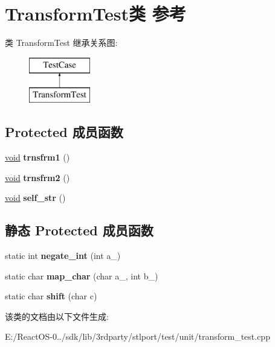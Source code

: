 \hypertarget{class_transform_test}{}\section{Transform\+Test类 参考}
\label{class_transform_test}
类 Transform\+Test 继承关系图\+:\begin{figure}[H]
\begin{center}
\leavevmode
\includegraphics[height=2.000000cm]{class_transform_test}
\end{center}
\end{figure}
\subsection*{Protected 成员函数}
\begin{DoxyCompactItemize}
\item 
\mbox{\label{class_transform_test_adeccd6cd54c7ce060ed81268fd830911}} 
\hyperlink{interfacevoid}{void} {\bfseries trnsfrm1} ()
\item 
\mbox{\label{class_transform_test_a509782b8bc9e72686ef280e8df1918a5}} 
\hyperlink{interfacevoid}{void} {\bfseries trnsfrm2} ()
\item 
\mbox{\label{class_transform_test_ad403b36ea7498d116e8eb1fce22c361c}} 
\hyperlink{interfacevoid}{void} {\bfseries self\+\_\+str} ()
\end{DoxyCompactItemize}
\subsection*{静态 Protected 成员函数}
\begin{DoxyCompactItemize}
\item 
\mbox{\label{class_transform_test_a5a16ac6ef0ca960c1a8a675616050ac3}} 
static int {\bfseries negate\+\_\+int} (int a\+\_\+)
\item 
\mbox{\label{class_transform_test_a73b20d1af962acab608ccd1eb50cb60e}} 
static char {\bfseries map\+\_\+char} (char a\+\_\+, int b\+\_\+)
\item 
\mbox{\label{class_transform_test_af7ffa91c8d7f84eac5a60b0f4242ea08}} 
static char {\bfseries shift} (char c)
\end{DoxyCompactItemize}


该类的文档由以下文件生成\+:\begin{DoxyCompactItemize}
\item 
E\+:/\+React\+O\+S-\/0../sdk/lib/3rdparty/stlport/test/unit/transform\+\_\+test.\+cpp\end{DoxyCompactItemize}
